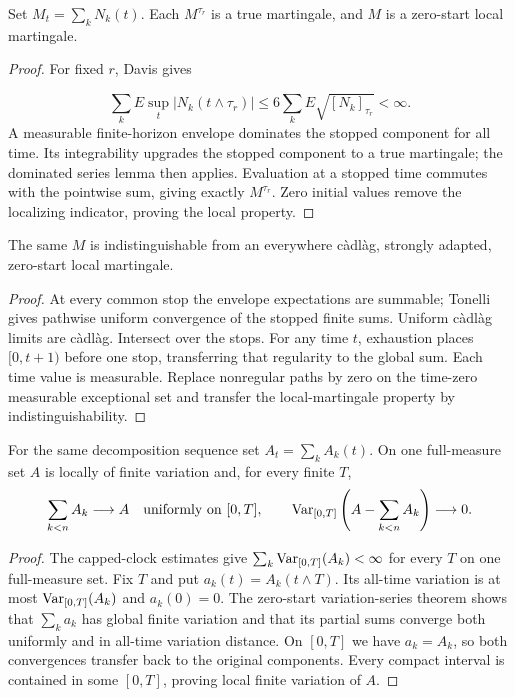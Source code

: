 \begin{lemma}
Set $M_t=\sum_kN_k(t)$. Each $M^{\tau_r}$ is a true martingale, and $M$
is a zero-start local martingale.
\end{lemma}
\begin{proof}
For fixed $r$, Davis gives

\[
 \sum_kE\sup_t|N_k(t\wedge\tau_r)|\leq6\sum_kE\sqrt{[N_k]_{\tau_r}}<\infty.
\]
A measurable finite-horizon envelope dominates the stopped component for all
time. Its integrability upgrades the stopped component to a true martingale;
the dominated series lemma then applies. Evaluation at a stopped time
commutes with the pointwise sum, giving exactly $M^{\tau_r}$.
Zero initial values remove the localizing indicator, proving the local property.
\end{proof}
\begin{lemma}
The same $M$ is indistinguishable from an everywhere c\`adl\`ag, strongly
adapted, zero-start local martingale.
\end{lemma}
\begin{proof}
At every common stop the envelope expectations are summable; Tonelli gives
pathwise uniform convergence of the stopped finite sums. Uniform c\`adl\`ag
limits are c\`adl\`ag. Intersect over the stops. For any time $t$, exhaustion
places $[0,t+1)$ before one stop, transferring that regularity to the global
sum. Each time value is measurable. Replace nonregular paths by zero on the
time-zero measurable exceptional set and transfer the local-martingale property
by indistinguishability.
\end{proof}
\begin{lemma}
For the same decomposition sequence set $A_t=\sum_kA_k(t)$.
On one full-measure set $A$ is locally of finite variation and, for every finite $T$,
\[
 \sum_{k<n}A_k\longrightarrow A\quad\text{uniformly on }[0,T],\qquad
 \operatorname{Var}_{[0,T]}\left(A-\sum_{k<n}A_k\right)\longrightarrow0.
\]
\end{lemma}
\begin{proof}
The capped-clock estimates give
$\sum_k\operatorname{Var}_{[0,T]}(A_k)<\infty$ for every $T$ on one full-measure set.
Fix $T$ and put $a_k(t)=A_k(t\wedge T)$. Its all-time variation is at most
$\operatorname{Var}_{[0,T]}(A_k)$ and $a_k(0)=0$.
The zero-start variation-series theorem shows that $\sum_ka_k$ has global
finite variation and that its partial sums converge both uniformly and
in all-time variation distance. On $[0,T]$ we have $a_k=A_k$, so both
convergences transfer back to the original components. Every compact
interval is contained in some $[0,T]$, proving local finite variation of $A$.
\end{proof}
